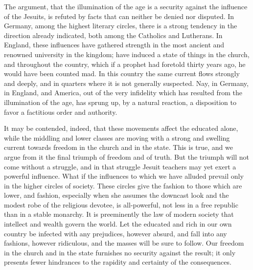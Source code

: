 \documentclass[]{book}
\begin{document}
The argument, that the illumination of the age is a security against the influence of the Jesuits, is refuted by facts that can neither be denied nor disputed. In Germany, among the highest literary circles, there is a strong tendency in the direction already indicated, both among the Catholics and Lutherans. In England, these influences have gathered strength in the most ancient and renowned university in the kingdom; have induced a state of things in the church, and throughout the country, which if a prophet had foretold thirty years ago, he would have been counted mad. In this country the same current flows strongly and deeply, and in quarters where it is not generally suspected. Nay, in Germany, in England, and America, out of the very infidelity which has resulted from the illumination of the age, has sprung up, by a natural reaction, a disposition to favor a factitious order and authority.

It may be contended, indeed, that these movements affect the educated alone, while the middling and lower classes are moving with a strong and swelling current towards freedom in the church and in the state. This is true, and we argue from it the final triumph of freedom and of truth. But the triumph will not come without a struggle, and in that struggle Jesuit teachers may yet exert a powerful influence. What if the influences to which we have alluded prevail only in the higher circles of society. These circles give the fashion to those which are lower, and fashion, especially when she assumes the downcast look and the modest robe of the religious devotee, is all-powerful, not less in a free republic than in a stable monarchy. It is preeminently the law of modern society that intellect and wealth govern the world. Let the educated and rich in our own country be infected with any prejudices, however absurd, and fall into any fashions, however ridiculous, and the masses will be sure to follow. Our freedom in the church and in the state furnishes no security against the result; it only presents fewer hindrances to the rapidity and certainty of the consequences.
\end{document}
